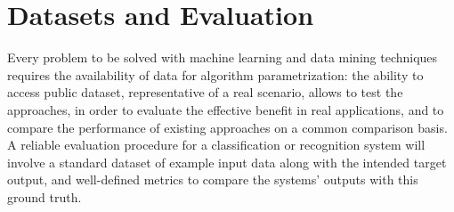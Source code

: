 \chapter{Datasets and Evaluation}\label{ch:datasets}
Every problem to be solved with machine learning and data mining techniques
requires the availability of data for algorithm parametrization: the ability to
access public dataset, representative of a real scenario, allows to test the approaches, in order to evaluate the effective benefit in real applications, and
to compare the performance of existing approaches on a common comparison
basis. A reliable
evaluation procedure for a classification or recognition system will involve a
standard dataset of example input data along with the intended target output, and
well-defined metrics to compare the systems’ outputs with this ground truth. 






